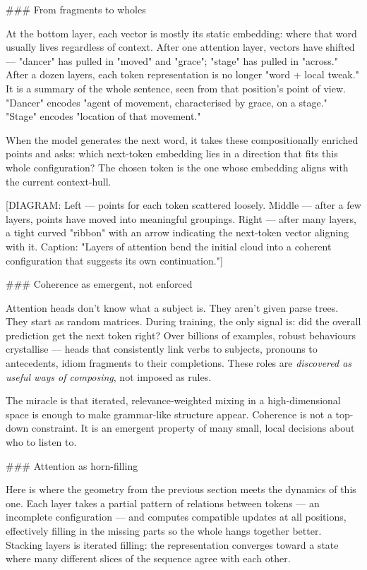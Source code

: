 \documentclass[12pt,a4paper]{article}
\begin{document}
\#\#\# From fragments to wholes

At the bottom layer, each vector is mostly its static embedding: where that word usually lives regardless of context. After one attention layer, vectors have shifted --- "dancer" has pulled in "moved" and "grace"; "stage" has pulled in "across." After a dozen layers, each token representation is no longer "word + local tweak." It is a summary of the whole sentence, seen from that position's point of view. "Dancer" encodes "agent of movement, characterised by grace, on a stage." "Stage" encodes "location of that movement."

When the model generates the next word, it takes these compositionally enriched points and asks: which next-token embedding lies in a direction that fits this whole configuration? The chosen token is the one whose embedding aligns with the current context-hull.

[DIAGRAM: Left --- points for each token scattered loosely. Middle --- after a few layers, points have moved into meaningful groupings. Right --- after many layers, a tight curved "ribbon" with an arrow indicating the next-token vector aligning with it. Caption: "Layers of attention bend the initial cloud into a coherent configuration that suggests its own continuation."]

\#\#\# Coherence as emergent, not enforced

Attention heads don't know what a subject is. They aren't given parse trees. They start as random matrices. During training, the only signal is: did the overall prediction get the next token right? Over billions of examples, robust behaviours crystallise --- heads that consistently link verbs to subjects, pronouns to antecedents, idiom fragments to their completions. These roles are \textit{discovered as useful ways of composing}, not imposed as rules.

The miracle is that iterated, relevance-weighted mixing in a high-dimensional space is enough to make grammar-like structure appear. Coherence is not a top-down constraint. It is an emergent property of many small, local decisions about who to listen to.

\#\#\# Attention as horn-filling

Here is where the geometry from the previous section meets the dynamics of this one. Each layer takes a partial pattern of relations between tokens --- an incomplete configuration --- and computes compatible updates at all positions, effectively filling in the missing parts so the whole hangs together better. Stacking layers is iterated filling: the representation converges toward a state where many different slices of the sequence agree with each other.
\end{document}
